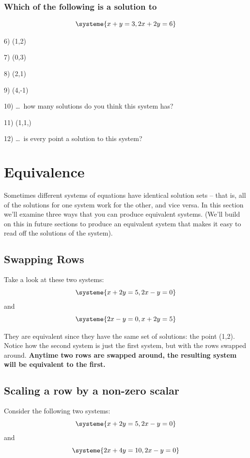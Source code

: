 \documentclass[a4paper,twoside,12pt]{memoir}  %
\begin{document}
\subsubsection{Which of the following is a solution to}
\begin{equation*}
  \systeme{
    x +  y = 3,
    2x + 2y = 6
  }
\end{equation*}

\begin{list}{}
\item 6) (1,2)
\item 7) (0,3)
\item 8) (2,1)
\item 9) (4,-1)
\item 10) \ldots\ how many solutions do you think this system has?
\item 11) (1,1,)
\item 12) \ldots\ is every point a solution to this system?
\end{list}

\section{Equivalence}
Sometimes different systems of equations have identical solution sets -- that is, all of the solutions for one system work for the other, and vice versa. In this section we'll examine three ways that you can produce equivalent systems. (We'll build on this in future sections to produce an equivalent system that makes it easy to read off the solutions of the system).

\subsection{Swapping Rows}
Take a look at these two systems:
\begin{equation*}
  \systeme{
    x + 2y = 5,
    2x - y = 0
  }
\end{equation*}
and
\begin{equation*}
  \systeme{
    2x - y = 0,
    x + 2y = 5
  }
\end{equation*}

They are equivalent since they have the same set of solutions: the point (1,2).
Notice how the second system is just the first system, but with the rows swapped around.
\textbf{Anytime two rows are swapped around, the resulting system will be equivalent to the first.}

\subsection{Scaling a row by a non-zero scalar}
Consider the following two systems:
\begin{equation*}
  \systeme{
    x + 2y = 5,
    2x - y = 0
  }
\end{equation*}
and
\begin{equation*}
  \systeme{
    2x + 4y = 10,
    2x - y = 0
  }
\end{equation*}
\end{document}
